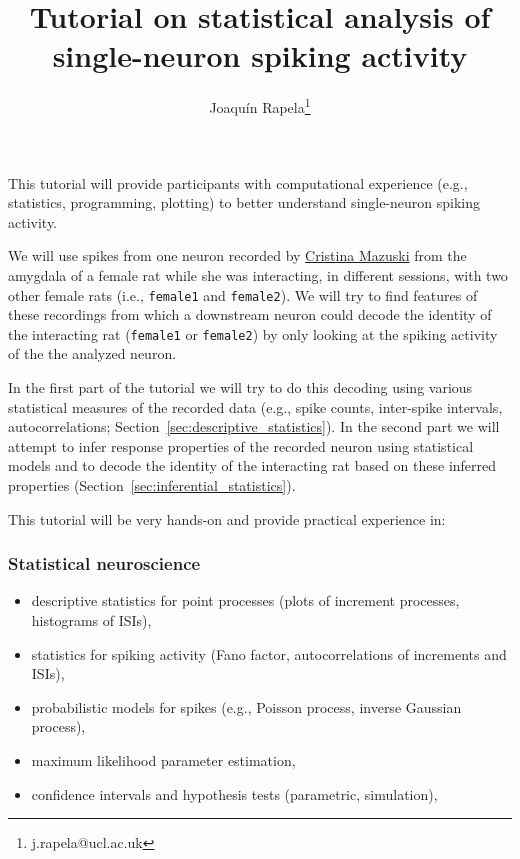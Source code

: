 \documentclass[10pt]{article}
\title{Tutorial on statistical analysis of single-neuron spiking activity}
\author{Joaqu\'{i}n Rapela\thanks{j.rapela@ucl.ac.uk}}
\begin{document}
\maketitle

This tutorial will provide participants with computational experience
(e.g., statistics, programming, plotting) to better understand single-neuron
spiking activity.

We will use spikes from one neuron recorded by \href{https://www.sainsburywellcome.org/web/people/cristina-mazuski}{Cristina Mazuski} from the
amygdala of a female rat while she was interacting, in different sessions,
with two other female rats (i.e., \texttt{female1} and \texttt{female2}). We will try to find
features of these recordings from which a downstream neuron could decode the
identity of the interacting rat (\texttt{female1} or \texttt{female2}) by only looking at the
spiking activity of the the analyzed neuron.

In the first part of the tutorial we will try to do this decoding using various
statistical measures of the recorded data (e.g., spike counts, inter-spike
intervals, autocorrelations; Section~\ref{sec:descriptive_statistics}). In the
second part we will attempt to infer response properties of the recorded neuron
using statistical models and to decode the identity of the interacting rat
based on these inferred properties (Section~\ref{sec:inferential_statistics}).

This tutorial will be very hands-on and provide practical experience in:

\subsubsection*{Statistical neuroscience}

        \begin{itemize}
            \item descriptive statistics for point processes (plots of increment processes, histograms of ISIs),
            \item statistics for spiking activity (Fano factor, autocorrelations of increments and ISIs),
            \item probabilistic models for spikes (e.g., Poisson process, inverse Gaussian process),
            \item maximum likelihood parameter estimation,
            \item confidence intervals and hypothesis tests (parametric, simulation),
        \end{itemize}
\end{document}
